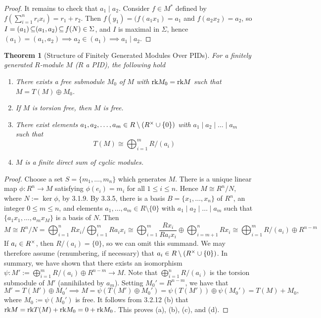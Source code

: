 \documentclass[11pt]{book}
\newcounter{counter}
\newtheorem{theorem}[counter]{Theorem}   \newtheorem*{theorem*}{Theorem}   \newtheorem{lemma}[counter]{Lemma}   \newtheorem{corollary}[counter]{Corollary}
\theoremstyle{definition}   \newtheorem{defn}[counter]{Definition} %
\newcommand{\bs}{\setminus}   \newcommand{\A}{\mathcal{A}}   \newcommand{\sy}{\textnormal{Syl}}   \newcommand{\size}[1]{\left| #1 \right|}
\DeclareMathOperator{\ra}{\rightarrow}   \DeclareMathOperator{\Poly}{\mathbf{P}}   \DeclareMathOperator{\spn}{\textnormal{span}}   \DeclareMathOperator{\aut}{\textnormal{Aut}}
\numberwithin{counter}{chapter}
\begin{document}
\begin{proof}
It remains to check that $a_1 \mid a_2$. Consider $f \in M^*$ defined by $f(\sum_{i=1}^n r_i x_i) = r_1 + r_2$. Then $f(y_1) = (f(a_1x_1) = a_1$ and $f(a_2 x_2) = a_2$, so $I = (a_1) \operatorname{\subseteq} (a_1,a_2) \operatorname{\subseteq} f(N) \in \Sigma$, and $I$ is maximal in $\Sigma$, hence $(a_1) = (a_1,a_2) \implies a_2 \in (a_1) \implies a_1 \mid a_2$.
\end{proof}

\newpage

\begin{theorem}[Structure of Finitely Generated Modules Over PIDs]
For a finitely generated $R$-module $M$ ($R$ a PID), the following hold
\begin{enumerate}
\item[(a)] There exists a free submodule $M_0$ of $M$ with $\textnormal{rk} M_0 = \textnormal{rk} M$ such that $M = T(M) \oplus M_0$.
\item[(b)] If $M$ is torsion free, then $M$ is free.
\item[(c)] There exist elements $a_1,a_2,\dots,a_m \in R\bs(R\x \cup \{0\})$ with $a_1 \mid a_2 \mid \dots \mid a_m$ such that
	\[T(M) \cong \bigoplus_{i=1}^m R/(a_i) \]
\item[(d)] $M$ is a finite direct sum of cyclic modules.
\end{enumerate}
\end{theorem}

\begin{proof}
Choose a set $S = \{m_1,\dots,m_n\}$ which generates $M$. There is a unique linear map $\phi : R^n \ra M$ satisfying $\phi(e_i) = m_i$ for all $1 \leq i \leq n$. Hence $M \cong R^n/N$, where $N := \ker \phi$, by 3.1.9. By 3.3.5, there is a basis $B = \{x_1,\dots,x_n\}$ of $R^n$, an integer $0 \leq m \leq n$, and elements $a_1,\dots,a_m \in R \bs \{0\}$ with $a_1 \mid a_2 \mid \dots \mid a_m$ such that $\{a_1x_1,\dots,a_mx_M\}$ is a basis of $N$. Then
	\[M \cong R^n/N = \bigoplus_{i=1}^n Rx_i/\bigoplus_{i=1}^m Ra_ix_i \cong \bigoplus_{i=1}^m \frac{Rx_i}{Ra_ix_i} \oplus \bigoplus_{i=m+1}^n Rx_i \cong \bigoplus_{i=1}^m R/(a_i) \oplus R^{n-m} \]
If $a_i \in R^{\times}$, then $R/(a_i) = \{0\}$, so we can omit this summand. We may therefore assume (renumbering, if necessary) that $a_i \in R \bs (R\x \cup \{0\})$. In summary, we have shown that there exists an isomorphism $\psi : M' := \bigoplus_{i=1}^m R/(a_i) \oplus R^{n-m} \ra M$. Note that $\bigoplus_{i=1}^n R/(a_i)$ is the torsion submodule of $M'$ (annihilated by $a_m$). Setting $M_0' = R^{n-m}$, we have that
	\[M' = T(M') \oplus M_0' \implies M = \psi(T(M') \oplus M_0') = \psi(T(M')) \oplus \psi(M_0') = T(M) + M_0, \]
where $M_0 := \psi(M_0')$ is free. It follows from 3.2.12 (b) that $\textnormal{rk} M = \textnormal{rk} T(M) + \textnormal{rk} M_0 = 0 + \textnormal{rk} M_0$. This proves (a), (b), (c), and (d).
\end{proof}
\end{document}
